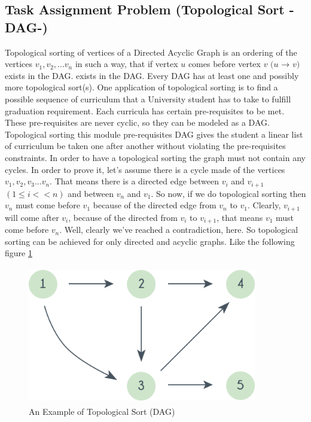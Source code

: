 \newpage

\subsection{Task Assignment Problem (Topological Sort -DAG-)}
\hspace{7mm} Topological sorting of vertices of a Directed Acyclic Graph is an ordering of the vertices $v_1, v_2, ... v_n$ in such a way, that if vertex $u$ comes before vertex $v$ $(u $ → $ v)$ exists in the DAG. 
exists in the DAG. Every DAG has at least one and possibly more topological sort(s). One application of topological sorting is to find a possible sequence of curriculum that a University student has to take to fulfill graduation requirement. Each curricula has certain pre-requisites to be met. These pre-requisites are never cyclic, so they can be modeled as a DAG. Topological sorting this module pre-requisites DAG gives the student a linear list of curriculum be taken one after another without violating the pre-requisites constraints. In order to have a topological sorting the graph must not contain any cycles. In order to prove it, let's assume there is a cycle made of the vertices $v_1, v_2, v_3 ... v_n$. That means there is a directed edge between $v_i$ and $v_{i+1}$ $(1 \le i \lt< n)$ and between $v_n$ and $v_1$. So now, if we do topological sorting then $v_n$ must come before $v_1$ because of the directed edge from $v_n$ to $v_1$. Clearly, $v_{i+1}$ will come after $v_i$, because of the directed from $v_i$ to $v_{i+1}$, that means $v_1$ must come before $v_n$. Well, clearly we've reached a contradiction, here. So topological sorting can be achieved for only directed and acyclic graphs. Like the following figure \ref{fig:topo-sort}
\begin{figure}[h]
    \centering
\includegraphics[width=10cm, height=6cm]{topo-sort.png}
 \caption{An Example of Topological Sort (DAG)}\footnotemark
    \label{fig:topo-sort}
\end{figure}

